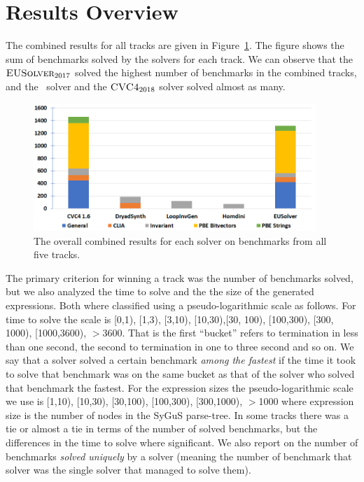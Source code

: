 \section{Results Overview}
\label{sec:comp-results}

The combined results for all tracks are given in Figure~\ref{fig:combinedresults}. The figure shows the sum of benchmarks solved by the solvers for each track. We can observe that the $\textsc{EUSolver}_{2017}$ solved the highest number of benchmarks in the combined tracks, and   the \euphony\ solver and the $\textsc{CVC4}_{2018}$ solver  solved almost as many.


\begin{figure}
	\centering
	\includegraphics[width=0.95\textwidth]{figures/TotalSolved.png}
	\caption{The overall combined results for each solver on benchmarks from all five tracks.}
	\label{fig:combinedresults}
\end{figure}



The primary criterion for winning a track was the number of benchmarks solved, but we also analyzed the time to solve and the the size of the generated expressions. Both where classified using a pseudo-logarithmic scale as follows.
For time to solve the scale is [0,1), [1,3), [3,10), [10,30),[30, 100), [100,300), [300, 1000), [1000,3600), $>$3600. That is the first ``bucket'' refers to termination in less than one second, the second to termination in one to three second and so on. We say that a solver solved a certain benchmark \emph{among the fastest} if the time it took to solve that benchmark was on the same bucket as that of the solver who solved that benchmark the fastest. 
For the expression sizes the pseudo-logarithmic scale we use is [1,10), [10,30), [30,100), [100,300), [300,1000), $>$1000 where expression size is the number of nodes in the SyGuS parse-tree.
In some tracks there was a tie or almost a tie in terms of the number of solved benchmarks, but the differences in the time to solve where significant.
We also report on the number of benchmarks \emph{solved uniquely} by a solver (meaning the number of benchmark that solver was the single solver that managed to solve them).



